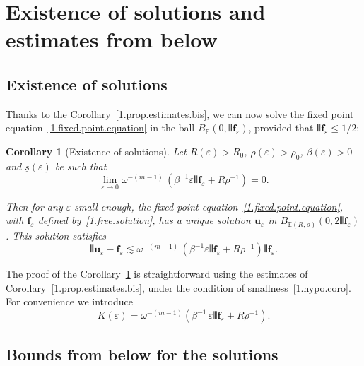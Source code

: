 \documentclass[10pt]{amsart}
\newtheorem{coro}[cdrthm]{Corollary}
\theoremstyle{definition}
\theoremstyle{plain}
\newcommand*\e{\varepsilon}
\newcommand*\EE{{\mathbb E}}
\newcommand{\ubf}{{\mathbf u}}
\newcommand*\f{{\mathbf f}}
\newcommand*\und{\underline}
\DeclarePairedDelimiter{\VERT}{|\mkern -1.6mu|\mkern -1.6mu|}{|\mkern -1.6mu|\mkern -1.6mu|}
\begin{document}
\section{Existence of solutions and estimates from below}\label{1.section.existence}



\subsection{Existence of solutions}

Thanks to the Corollary~\ref{1.prop.estimates.bis}, we can now solve the fixed point equation~\eqref{1.fixed.point.equation} in the ball $B_{\EE}\left(0,\VERT{\f_{\e}}\right)$, provided that $\VERT{\f_{\e}} \leq 1/2$:

\begin{coro}[Existence of solutions]\label{1.coro.fixedpoint}
Let $R(\e) > R_0$, $\rho(\e) > \rho_0$, $\beta(\e) >0$ and $\und{s}(\e)$ be such that
\begin{equation}\label{1.hypo.coro}
\lim_{\e\to 0} \omega^{-(m-1)}\,\left(\beta^{-1} \e\VERT{\f_{\e}} + R\rho^{-1}\right) = 0.
\end{equation}

Then for any $\e$ small enough, the fixed point equation~\eqref{1.fixed.point.equation}, with $\f_{\e}$ defined by~\eqref{1.free.solution}, has a unique solution $\ubf_{\e}$ in $B_{\EE(R,\rho)}\left(0,2\VERT{\f_{\e}}\right)$. This solution satisfies
\begin{equation}\label{1.esti.solution}
\VERT{\ubf_{\e} - \f_{\e}} \lesssim \omega^{-(m-1)}\,\left(\beta^{-1} \e \VERT{\f_{\e}} + R\rho^{-1}\right)\VERT{\f_{\e}}.
\end{equation}
\end{coro}

The proof of the Corollary~\ref{1.coro.fixedpoint} is straightforward using the estimates of Corollary~\ref{1.prop.estimates.bis}, under the condition of smallness~\eqref{1.hypo.coro}. For convenience we introduce
\begin{equation}\label{1.def.K_epsilon}
K(\e) = \omega^{-(m-1)}\left(\beta^{-1} \, \e \VERT{\f_{\e}} + R\rho^{-1}\right).
\end{equation}



\subsection{Bounds from below for the solutions}\label{1.subsection.below}
\end{document}
